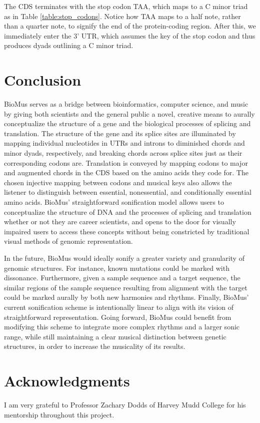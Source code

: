 \documentclass[letterpaper]{article}
\begin{document}
The CDS terminates with the stop codon TAA, which maps to a C minor triad as in Table \ref{table:stop_codons}. Notice how TAA maps to a half note, rather than a quarter note, to signify the end of the protein-coding region. After this, we immediately enter the 3' UTR, which assumes the key of the stop codon and thus produces dyads outlining a C minor triad. 

\section{Conclusion}
BioMus serves as a bridge between bioinformatics, computer science, and music by giving both scientists and the general public a novel, creative means to aurally conceptualize the structure of a gene and the biological processes of splicing and translation. The structure of the gene and its splice sites are illuminated by mapping individual nucleotides in UTRs and introns to diminished chords and minor dyads, respectively, and breaking chords across splice sites just as their corresponding codons are. Translation is conveyed by mapping codons to major and augmented chords in the CDS based on the amino acids they code for. The chosen injective mapping between codons and musical keys also allows the listener to distinguish between essential, nonessential, and conditionally essential amino acids. BioMus' straightforward sonification model allows users to conceptualize the structure of DNA and the processes of splicing and translation whether or not they are career scientists, and opens to the door for visually impaired users to access these concepts without being constricted by traditional visual methods of genomic representation. 

In the future, BioMus would ideally sonify a greater variety and granularity of genomic structures. For instance, known mutations could be marked with dissonance. Furthermore, given a sample sequence and a target sequence, the similar regions of the sample sequence resulting from alignment with the target could be marked aurally by both new harmonies and rhythms. Finally, BioMus' current sonification scheme is intentionally linear to align with its vision of straightforward representation. Going forward, BioMus could benefit from modifying this scheme to integrate more complex rhythms and a larger sonic range, while still maintaining a clear musical distinction between genetic structures, in order to increase the musicality of its results.


\section{Acknowledgments}

I am very grateful to Professor Zachary Dodds of Harvey Mudd College for his mentorship throughout this project.




\end{document}
